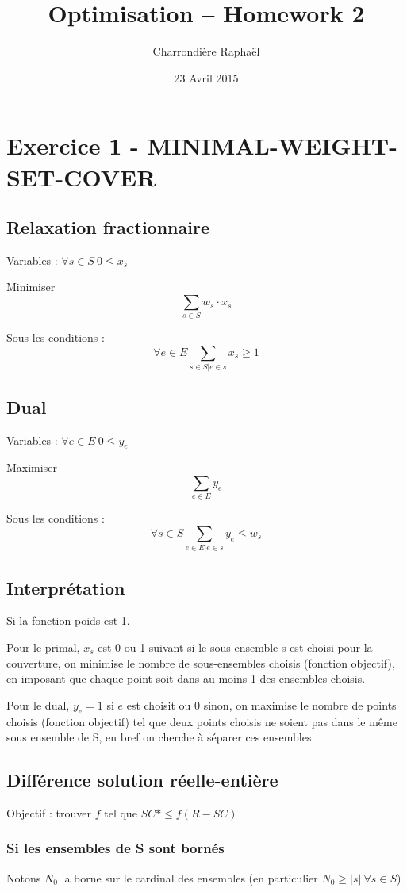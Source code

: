 \documentclass{article}
\title{Optimisation -- Homework 2}
\author{Charrondière Raphaël}
\date{23 Avril 2015}
\begin{document}
\maketitle
\section*{Exercice 1 - MINIMAL-WEIGHT-SET-COVER}
\subsection*{Relaxation fractionnaire}
Variables : $\forall s\in S\ 0 \leq x_s$

Minimiser $$\sum_{s \in S} w_s \cdot x_s$$

Sous les conditions : $$\forall e \in E \sum_{s \in S | e \in s} x_s \geq 1$$

\subsection*{Dual}
Variables : $\forall e\in E\ 0 \leq y_e$

Maximiser $$\sum_{e \in E} y_e$$

Sous les conditions : $$\forall s \in S \sum_{e \in E | e \in s} y_e \leq w_s$$

\subsection*{Interprétation}

Si la fonction poids est 1.

Pour le primal, $x_s$ est 0 ou 1 suivant si le sous ensemble s est choisi pour la couverture, on minimise  le nombre de sous-ensembles choisis (fonction objectif), en imposant que chaque point soit dans au moins 1 des ensembles choisis.

Pour le dual, $y_e=1$ si $e$ est choisit ou $0$ sinon, on maximise le nombre de points choisis (fonction objectif) tel que deux points choisis ne soient pas dans le même sous ensemble de S, en bref on cherche à séparer ces ensembles.

\subsection*{Différence solution réelle-entière}

Objectif : trouver $f$ tel que $SC*\leq f(R-SC)$

\subsubsection*{Si les ensembles de S sont bornés}
 Notons $N_0$ la borne sur le cardinal des ensembles (en particulier $N_0 \geq |s| \ \forall s\in S$)
\end{document}
